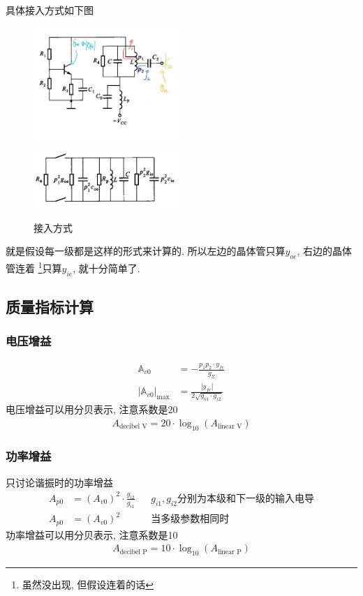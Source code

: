 \documentclass[a4paper]{report}
\begin{document}
具体接入方式如下图
\begin{figure}[H]
\centering
\includegraphics[width=0.5\textwidth]{amp_small_circuit_y.png}
\includegraphics[width=0.5\textwidth]{amp_small_circuit_2.png}
\caption{接入方式}
\end{figure}
就是假设每一级都是这样的形式来计算的. 所以左边的晶体管只算$y_{oe}$, 右边的晶体管连着 \footnote{虽然没出现, 但假设连着的话}只算$y_{ie}$, 就十分简单了. 
\subsection{质量指标计算}
\subsubsection{电压增益}
\begin{align*}
  \mathbb{A}_{v0}&=-\frac{p_1p_2\cdot y_{fe}}{g_\Sigma}\\
  |\mathbb{A}_{v0}|_\text{max}&=\frac{|y_{fe}|}{2\sqrt{g_{o1}\cdot g_{i2}}}
\end{align*}
电压增益可以用分贝表示, 注意系数是20
\begin{align*}
  A_{\text{decibel V}}=20\cdot \log_{10}(A_{\text{linear V}})
\end{align*}
\subsubsection{功率增益}
只讨论谐振时的功率增益
\begin{align*}
  A_{p0}&=(A_{v0})^2\cdot \frac{g_{i2}}{g_{i1}} &&\text{$g_{i1},g_{i2}$分别为本级和下一级的输入电导}\\
  A_{p0}&=(A_{v0})^2 &&\text{当多级参数相同时}
\end{align*}
功率增益可以用分贝表示, 注意系数是10
\begin{align*}
  A_{\text{decibel P}}=10\cdot \log_{10}(A_{\text{linear P}})
\end{align*}
\end{document}
